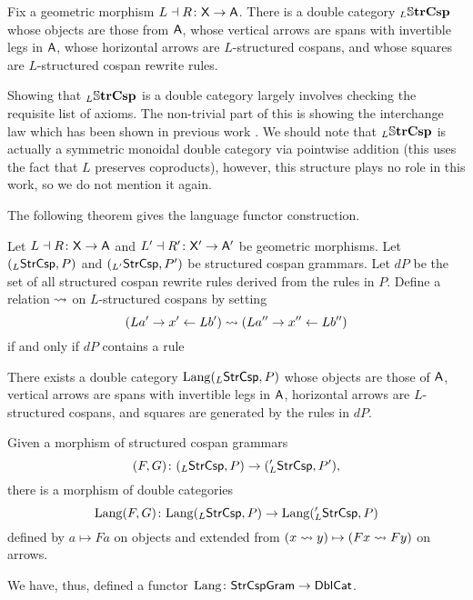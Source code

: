 \documentclass[oneside]{amsart}
\begin{document}
\begin{definition}\label{df:L_SSStrCsp}
  Fix a geometric morphism $L\dashv R \colon \mathsf{X} \to
  \mathsf{A}$. There is a double category $_L\mathbb{S} \mathbf{trCsp}$ whose
  objects are those from $\mathsf{A}$, whose vertical arrows are
  spans with invertible legs in $\mathsf{A}$, whose horizontal
  arrows are $L$-structured cospans, and whose squares
  are $L$-structured cospan rewrite rules.    
\end{definition}

Showing that $_L\mathbb{S} \mathbf{trCsp}$ is a double category
largely involves checking the requisite list of
axioms. The non-trivial part of this is showing
the interchange law which has been shown in
previous work \parencite[Lem.~4.2,
Lem.~4.3]{CicCour_SpCspTopos}. We should note that
$ _L\mathbb{S} \mathbf{trCsp} $ is actually a symmetric monoidal
double category via pointwise addition
\parencite[Lem.~4.4]{CicCour_SpCspTopos} (this uses the
fact that $ L $ preserves coproducts), however,
this structure plays no role in this work, so we
do not mention it again.

The following theorem gives the language
functor construction.

\begin{theorem}
  \label{thm:StrCsp_Lang_functorial}
  Let $ L \dashv R \colon \mathsf{X} \to \mathsf{A} $ and
  $ L' \dashv R' \colon \mathsf{X}' \to \mathsf{A}' $ be geometric
  morphisms. Let $ (_L\mathsf{StrCsp},P) $ and
  $ ( _{L'}\mathsf{StrCsp},P' ) $ be structured cospan
  grammars. Let $ dP $ be the set of all
  structured cospan rewrite rules derived from the
  rules in $ P $. Define a relation
  $ \rightsquigarrow $ on $ L $-structured cospans by
  setting
  $$ ( La' \to x' \leftarrow Lb' ) \rightsquigarrow ( La'' \to x''
    \leftarrow Lb'' ) $$ if and only if $ dP $ contains a rule
  
  
  There exists a double category
  $ \mathrm{Lang} (_L\mathsf{StrCsp} , P) $ whose objects are
  those of $ \mathsf{A} $, vertical arrows are spans with
  invertible legs in $ \mathsf{A} $, horizontal arrows are
  $ L $-structured cospans, and
  squares are generated by the rules in $ dP $.

  Given a morphism of structured cospan grammars
  $$ (F,G) \colon (_L \mathsf{StrCsp}, P) \to ({_L'}\mathsf{StrCsp} , P'), $$
  there is a morphism of double categories
  $$ \mathrm{Lang} (F,G) \colon \mathrm{Lang} (_L \mathsf{StrCsp}, P) \to \mathrm{Lang} (_L'
  \mathsf{StrCsp}, P) $$ defined by $ a \mapsto Fa $ on objects and
  extended from
  $ (x \rightsquigarrow y) \mapsto ( Fx \rightsquigarrow Fy ) $ on
  arrows.

  We have, thus, defined a functor
  $ \mathrm{Lang} \colon \mathsf{StrCspGram} \to \mathsf{DblCat} $.
\end{theorem}
\end{document}

